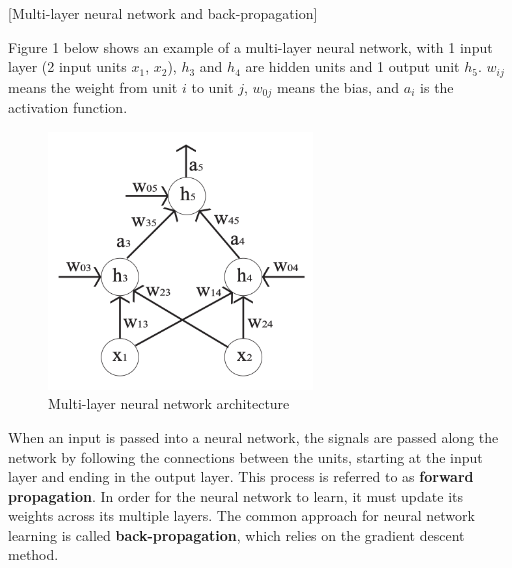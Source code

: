 \item {} [Multi-layer neural network and back-propagation]

Figure 1 below shows an example of a multi-layer neural network, with 1 input layer (2 input units $x_1$, $x_2$), $h_3$ and $h_4$ are hidden units and 1 output unit $h_5$. $w_{ij}$ means the weight from unit $i$ to unit $j$, $w_{0j}$ means the bias, and $a_i$ is the activation function. \\
\begin{figure}[h]
    \centering
    \includegraphics[width=7cm]{figure/p4.png}
    \caption{Multi-layer neural network architecture}
\end{figure}

When an input is passed into a neural network, the signals are passed along the network by following the connections between the units, starting at the input layer and ending in the output layer. This process is referred to as \textbf{forward propagation}. In order for the neural network to learn, it must update its weights across its multiple layers. The common approach for neural network learning is called \textbf{back-propagation}, which relies on the gradient descent method.

